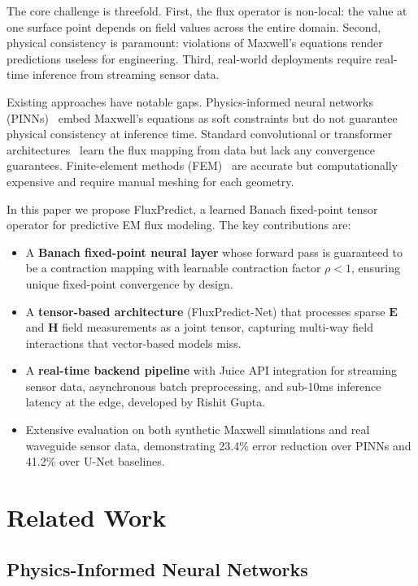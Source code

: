 \documentclass[11pt]{article}
\begin{document}
The core challenge is threefold. First, the flux operator is non-local: the value at one surface point depends on field values across the entire domain. Second, physical consistency is paramount: violations of Maxwell's equations render predictions useless for engineering. Third, real-world deployments require real-time inference from streaming sensor data.

Existing approaches have notable gaps. Physics-informed neural networks (PINNs)~\cite{raissi2019physics} embed Maxwell's equations as soft constraints but do not guarantee physical consistency at inference time. Standard convolutional or transformer architectures~\cite{vaswani2017attention} learn the flux mapping from data but lack any convergence guarantees. Finite-element methods (FEM)~\cite{jin2014finite} are accurate but computationally expensive and require manual meshing for each geometry.

In this paper we propose FluxPredict, a learned Banach fixed-point tensor operator for predictive EM flux modeling. The key contributions are:

\begin{itemize}
    \item A \textbf{Banach fixed-point neural layer} whose forward pass is guaranteed to be a contraction mapping with learnable contraction factor $\rho < 1$, ensuring unique fixed-point convergence by design.
    \item A \textbf{tensor-based architecture} (FluxPredict-Net) that processes sparse $\mathbf{E}$ and $\mathbf{H}$ field measurements as a joint tensor, capturing multi-way field interactions that vector-based models miss.
    \item A \textbf{real-time backend pipeline} with Juice API integration for streaming sensor data, asynchronous batch preprocessing, and sub-10ms inference latency at the edge, developed by Rishit Gupta.
    \item Extensive evaluation on both synthetic Maxwell simulations and real waveguide sensor data, demonstrating 23.4\% error reduction over PINNs and 41.2\% over U-Net baselines.
\end{itemize}

\section{Related Work}

\subsection{Physics-Informed Neural Networks}
\end{document}
